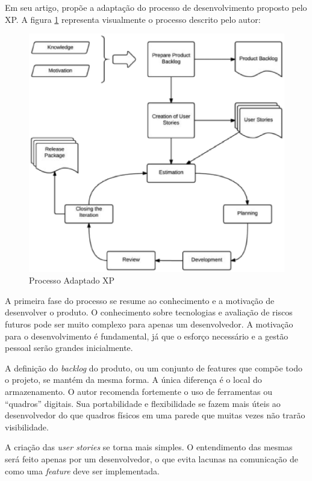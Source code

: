 Em seu artigo, \cite{Bernabe:2015} propõe a adaptação do processo de desenvolvimento proposto pelo XP. A figura \ref{fig04} representa visualmente o processo descrito pelo autor:

\begin{figure}[h]
	\centering
		\includegraphics[keepaspectratio=true,scale=0.6]{figuras/fig04.eps}
	\caption{Processo Adaptado XP \cite{Bernabe:2015}}
	\label{fig04}
\end{figure}

A primeira fase do processo se resume ao conhecimento e a motivação de desenvolver o produto. O conhecimento sobre tecnologias e avaliação de riscos futuros pode ser muito complexo para apenas um desenvolvedor. A motivação para o desenvolvimento é fundamental, já que o esforço necessário e a gestão pessoal serão grandes inicialmente. \cite{Bernabe:2015}

A definição do \textit{backlog} do produto, ou um conjunto de features que compõe todo o projeto, se mantém da mesma forma.  A única diferença é o local do armazenamento. O autor recomenda fortemente o uso de ferramentas ou “quadros” digitais. Sua portabilidade e flexibilidade se fazem mais úteis ao desenvolvedor do que quadros físicos em uma parede que muitas vezes não trarão visibilidade.

A criação das \textit{user stories} se torna mais simples. O entendimento das mesmas será feito apenas por um desenvolvedor, o que evita lacunas na comunicação de como uma \textit{feature} deve ser implementada.

